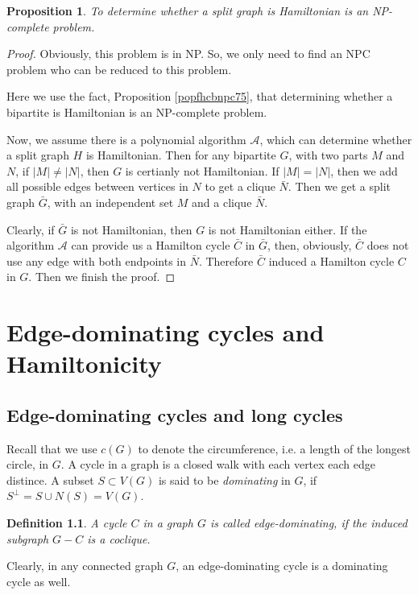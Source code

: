 \documentclass[12pt]{report}
\newtheorem{definition}{Definition}
\newtheorem{proposition}{Proposition}
\begin{document}
\begin{proposition}
To determine whether a split graph is Hamiltonian is an NP-complete problem.
\end{proposition}
\begin{proof}
Obviously, this problem is in NP. So, we only need to find an NPC problem who can be reduced to this problem.

Here we use the fact, Proposition \ref{popfhcbnpc75}, that determining whether a bipartite is Hamiltonian is an NP-complete problem.

Now, we assume there is a polynomial algorithm $\mathcal{A}$, which can determine whether a split graph $H$ is Hamiltonian.
Then for any bipartite $G$, with two parts $M$ and $N$, if $|M|\neq|N|$, then $G$ is certianly not Hamiltonian. 
If $|M|=|N|$, then we add all possible edges between vertices in $N$ to get a clique $\bar{N}$. Then we get a split graph $\bar{G}$, with an independent set $M$ and a clique $\bar{N}$.

Clearly, if $\bar{G}$ is not Hamiltonian, then $G$ is not Hamiltonian either. If the algorithm $\mathcal{A}$ can provide us a Hamilton cycle $\bar{C}$ in $\bar{G}$, then, obviously,  $\bar{C}$ does not use any edge with both endpoints in $\bar{N}$. Therefore $\bar{C}$ induced a Hamilton cycle $C$ in $G$. Then we finish the proof.
\end{proof}







\chapter{Edge-dominating cycles and Hamiltonicity}\label{ch3edcah}
\section{Edge-dominating cycles and long cycles}

Recall that we use $c(G)$ to denote the circumference, i.e. a length of the longest circle, in $G$. A cycle in a graph is a closed walk with each vertex each edge distince. A subset $S\subset V(G)$ is said to be {\em dominating} in $G$, if $S^{\perp}=S\cup N(S)=V(G)$.

\begin{definition}
A cycle $C$ in a graph $G$ is called edge-dominating, if the induced subgraph $G-C$ is a coclique.
\end{definition}
Clearly, in any connected graph $G$, an edge-dominating cycle is a dominating cycle as well.
\end{document}

